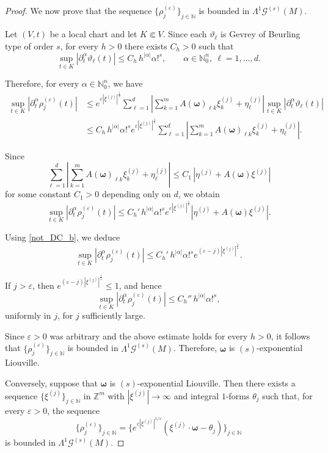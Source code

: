 \documentclass[11pt,reqno]{amsart}
\numberwithin{equation}{section}
\begin{document}
\begin{proof}
	
	We now prove that the sequence $\{\rho_j^{(\varepsilon)}\}_{j\in\mathbb{N}}$ is bounded in 
	$\mathsf{\Lambda}^1\mathscr{G}^{(s)}(M)$.
	
	Let $(V,t)$ be a local chart and let $K\Subset V$. 
	Since each $\vartheta_\ell$ is Gevrey of Beurling type of order $s$, 
	for every $h>0$ there exists $C_h>0$ such that
	\[
	\sup_{t\in K} |\partial_t^\alpha \vartheta_\ell(t)|
	\le C_h\, h^{|\alpha|}\alpha!^s, \qquad \alpha\in\mathbb{N}_0^n,
	\ \ell=1,\dots,d.
	\]
	
	Therefore, for every $\alpha\in\mathbb{N}_0^n$, we have
	\begin{align*}
		\sup_{t\in K} |\partial_t^\alpha \rho_j^{(\varepsilon)}(t)|
		&\le e^{\varepsilon|\xi^{(j)}|^{\frac{1}{s}}} \sum_{\ell=1}^{d} \left|
		\sum_{k=1}^{m} A(\boldsymbol{\omega})_{\ell k}\xi^{(j)}_k  + \eta^{(j)}_\ell \right| \sup_{t\in K} |\partial_t^\alpha \vartheta_\ell(t)| \\
		&\le C_h\, h^{|\alpha|}\alpha!^s e^{\varepsilon|\xi^{(j)}|^{\frac{1}{s}}} 		\sum_{\ell=1}^{d} \left| \sum_{k=1}^{m} A(\boldsymbol{\omega})_{\ell k}\xi^{(j)}_k
		+ \eta^{(j)}_\ell \right|.
	\end{align*}
	
	Since
	\[
	\sum_{\ell=1}^{d} \left| \sum_{k=1}^{m} A(\boldsymbol{\omega})_{\ell k}\xi^{(j)}_k
	+ \eta^{(j)}_\ell \right| \le C_1\, |\eta^{(j)} + A(\boldsymbol{\omega})\xi^{(j)}| 
	\]
	for some constant $C_1>0$ depending only on $d$, 
	we obtain
	\[
	\sup_{t\in K} |\partial_t^\alpha \rho_j^{(\varepsilon)}(t)|  \le C_h'\, h^{|\alpha|}\alpha!^s e^{\varepsilon|\xi^{(j)}|^{\frac{1}{s}}} |\eta^{(j)} + A(\boldsymbol{\omega})\xi^{(j)}|.
	\]
	
	Using \eqref{not_DC_b}, we deduce
	\[
	\sup_{t\in K} |\partial_t^\alpha \rho_j^{(\varepsilon)}(t)|
	\le 	C_h'\, h^{|\alpha|}\alpha!^s e^{(\varepsilon-j)|\xi^{(j)}|^{\frac{1}{s}}}.
	\]
	
	If $j>\varepsilon$, then $e^{(\varepsilon-j)|\xi^{(j)}|^{\frac{1}{s}}}\le 1$, and hence
	\[
	\sup_{t\in K} |\partial_t^\alpha \rho_j^{(\varepsilon)}(t)|
	\le C_h''\, h^{|\alpha|}\alpha!^s,
	\]
	uniformly in $j$, for $j$ sufficiently large.
	
	Since $\varepsilon>0$ was arbitrary and the above estimate holds for every $h>0$, 
	it follows that $\{\rho_j^{(\varepsilon)}\}_{j\in\mathbb{N}}$ is bounded in 
	$\mathsf{\Lambda}^1\mathscr{G}^{(s)}(M)$.	
	Therefore, $\boldsymbol{\omega}$ is $(s)$-exponential Liouville.
	
	Conversely, suppose that $\boldsymbol{\omega}$ is $(s)$-exponential Liouville. 
	Then there exists a sequence $\{\xi^{(j)}\}_{j\in\mathbb{N}}$ in $\mathbb{Z}^m$ with $|\xi^{(j)}|\to\infty$ 
	and integral $1$-forms $\theta_j$ such that, for every $\varepsilon>0$, 
	the sequence
	\[
	\{\rho_j^{(\varepsilon)} \}_{j\in\mathbb{N}} = \big\{e^{\varepsilon|\xi^{(j)}|^{1/s}} 	(\xi^{(j)}\cdot \boldsymbol{\omega} - \theta_j)\big\}_{j\in\mathbb{N}}
	\]
	is bounded in $\mathsf{\Lambda}^1\mathscr{G}^{(s)}(M)$.
	

\end{proof}
\end{document}
